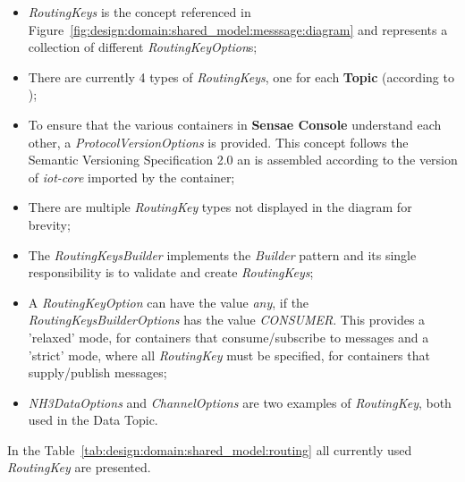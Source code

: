 \begin{itemize}
   \item \textit{RoutingKeys} is the concept referenced in Figure~\ref{fig:design:domain:shared_model:messsage:diagram} and represents a collection of different \textit{RoutingKeyOption}s;
   \item There are currently 4 types of \textit{RoutingKeys}, one for each \textbf{Topic} (according to );
   \item To ensure that the various containers in \textbf{Sensae Console} understand each other, a \textit{ProtocolVersionOptions} is provided. This concept follows the Semantic Versioning Specification 2.0 \parencite{semver} an is assembled according to the version of \textit{iot-core} imported by the container;
   \item There are multiple \textit{RoutingKey} types not displayed in the diagram for brevity;
   \item The \textit{RoutingKeysBuilder} implements the \textit{Builder} pattern and its single responsibility is to validate and create \textit{RoutingKeys};
   \item A \textit{RoutingKeyOption} can have the value \textit{any}, if the \textit{RoutingKeysBuilderOptions} has the value \textit{CONSUMER}. This provides a 'relaxed' mode, for containers that consume/subscribe to messages and a 'strict' mode, where all \textit{RoutingKey} must be specified, for containers that supply/publish messages;
   \item \textit{NH3DataOptions} and \textit{ChannelOptions} are two examples of \textit{RoutingKey}, both used in the Data Topic.
\end{itemize}

In the Table~\ref{tab:design:domain:shared_model:routing} all currently used \textit{RoutingKey} are presented.


